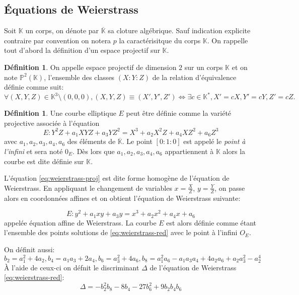 \documentclass[10pt,a4paper]{book}
\theoremstyle{plain}
\theoremstyle{definition}
\theoremstyle{definition}
\theoremstyle{definition}
\theoremstyle{definition}
\newtheorem{defi}[thm]{Définition}
\theoremstyle{remark}
\theoremstyle{remark}
\theoremstyle{definition}
\begin{document}
\subsection{\'Equations de Weierstrass}

Soit $\mathbb{K}$ un corps, on dénote par $\overline{\mathbb{K}}$ sa cloture algébrique. Sauf indication explicite contraire par convention on notera $p$ la caractérisitque du corps $\mathbb{K}$. On rappelle tout d'abord  la définition d'un espace projectif sur $\mathbb{K}$.

\begin{defi}
On appelle espace projectif de dimension $2$ sur un corps $\mathbb{K}$ et on note $\mathbb{P}^2(\mathbb{K})$, l'ensemble des classes $(X:Y:Z)$ de la relation d'équivalence définie comme suit:
\begin{equation*}
\forall (X,Y,Z) \in \mathbb{K}^3 \setminus (0,0,0), (X,Y,Z) \equiv (X',Y',Z') \Leftrightarrow \exists c \in \mathbb{K}^*, X'=cX, Y'=cY, Z'=cZ.
\end{equation*}
\end{defi}

\begin{defi}
Une courbe elliptique $E$ peut être définie comme la variété projective associée à l'équation
\begin{equation}
\label{eq:weierstrass-proj}
E:Y^2Z+a_1XYZ+a_3YZ^2=X^3+a_2X^2Z+a_4XZ^2+a_6Z^3
\end{equation}
avec $a_1,a_2,a_3,a_4,a_6$ des éléments de $\overline{\mathbb{K}}$. Le point $[0:1:0]$ est appelé le \emph{point à l'infini} et sera noté $0_E$. Dès lors que $a_1,a_2,a_3,a_4,a_6$ appartiennent à $\mathbb{K}$ alors la courbe est dite définie sur $\mathbb{K}$.
\end{defi}

L'équation \eqref{eq:weierstrass-proj} est dite forme homogène de l'équation de Weierstrass. En appliquant le changement de variables $x=\frac{X}{Z}$, $y=\frac{Y}{Z}$, on passe alors en coordonnées affines et on obtient l'équation de Weierstrass suivante:

\begin{equation}
\label{eq:weierstrass-red}
E:y^2+a_1xy+a_3y=x^3+a_2x^2+a_4x+a_6
\end{equation}
appelée équation affine de Weierstrass. La courbe $E$ est alors définie comme étant l'ensemble des points solutions de \eqref{eq:weierstrass-red} avec le point à l'infini $O_E$.

 On définit aussi:
\begin{equation*}
b_2=a_1^2+4a_2, b_4=a_1a_3+2a_4, b_6=a_3^2+4a_6, b_8=a_1^2a_6-a_1a_3a_4+4a_2a_6+a_2a_3^2-a_2^4
\end{equation*}
\`A l'aide de ceux-ci on défnit le discriminant $\Delta$ de l'équation de Weierstrass \eqref{eq:weierstrass-red}:
\begin{equation*}
\Delta = -b_2^2b_8-8b_4-27b_6^2+9b_2b_4b_6
\end{equation*}
\end{document}
